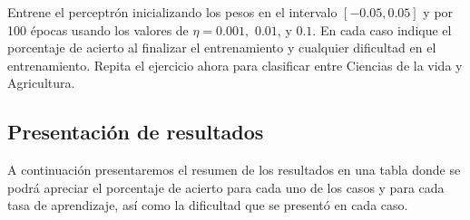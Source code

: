 \documentclass{article}
\theoremstyle{mytheoremstyle}
\theoremstyle{mytheoremstyle}
\theoremstyle{myproblemstyle}
\begin{document}
Entrene el perceptrón inicializando los pesos en el intervalo $[-0.05, 0.05]$ y por 100 épocas usando los valores de $\eta = 0.001,$ $0.01$, y $0.1$. En cada caso indique el porcentaje de acierto al finalizar el entrenamiento y cualquier dificultad en el entrenamiento. Repita el ejercicio ahora para clasificar entre Ciencias de la vida y Agricultura.

\subsection{Presentación de resultados}

A continuación presentaremos el resumen de los resultados en una tabla donde se podrá apreciar el porcentaje de acierto para cada uno de los casos y para cada tasa de aprendizaje, así como la dificultad que se presentó en cada caso.
\end{document}
